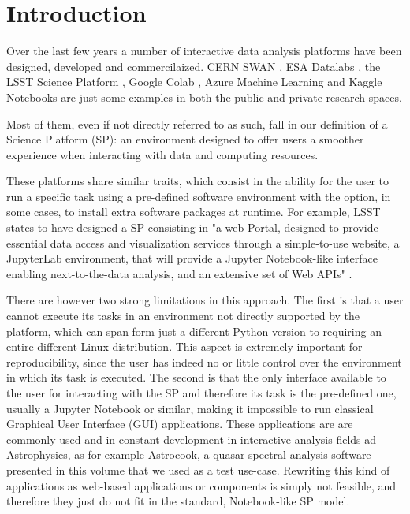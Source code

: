 \documentclass[11pt,twoside]{article}
\begin{document}
\section{Introduction}



Over the last few years a number of interactive data analysis platforms have been designed, developed and commercilaized. 
CERN SWAN \citep{piparo2018swan},
ESA Datalabs \citep{esadatalabs},
the LSST Science Platform \citep{juric2017lsst},
Google Colab \citep{bisong2019google},
Azure Machine Learning \citep{azureml}
and Kaggle Notebooks \citep{kagglenotebooks}
are just some examples in both the public and private research spaces.

Most of them, even if not directly referred to as such, fall in our definition of a Science Platform (SP): an environment designed to offer users a smoother experience when interacting with data and computing resources. 

These platforms share similar traits, which consist in the ability for the user to run a specific task using a pre-defined software environment with the option, in some cases, to install extra software packages at runtime. For example, LSST states to have designed a SP consisting in "a web Portal, designed to provide essential data access and visualization services through a simple-to-use website, a JupyterLab environment, that will provide a Jupyter Notebook-like interface enabling next-to-the-data analysis, and an extensive set of Web APIs" \citep[see][]{juric2017lsst}.

There are however two strong limitations in this approach. The first is that a user cannot execute its tasks in an environment not directly supported by the platform, which can span form just a different Python version to requiring an entire different Linux distribution. This aspect is extremely important for reproducibility, since the user has indeed no or little control over the environment in which its task is executed. The second is that the only interface available to the user for interacting with the SP and therefore its task is the pre-defined one, usually a Jupyter Notebook or similar, making it impossible to run classical Graphical User Interface (GUI) applications. These applications are are commonly used and in constant development in interactive analysis fields ad Astrophysics, as for example Astrocook, a quasar spectral analysis software presented in this volume \citep{P5-64_adassxxx} that we used as a test use-case. Rewriting this kind of applications as web-based applications or components is simply not feasible, and therefore they just do not fit in the standard, Notebook-like SP model.
 
\end{document}
